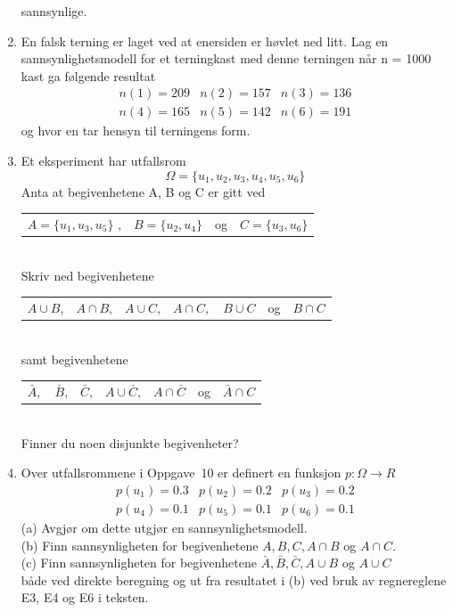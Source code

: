 \begin{enumerate}
     sannsynlige.
\item  En falsk terning er laget ved at enersiden er høvlet ned
     litt. Lag en sannsynlighetsmodell for et terningkast med
     denne terningen når n = 1000 kast ga følgende resultat
    \begin{eqnarray*}
        n(1)=209 & n(2)=157 & n(3)=136 \\
        n(4)=165 & n(5)=142 & n(6)=191 
    \end{eqnarray*}
     og hvor en tar hensyn til terningens form.
\item  Et eksperiment har utfallsrom
      \[ \Omega =\{u_1, u_2, u_3, u_4, u_5, u_6\} \]
     Anta at begivenhetene A, B og C er gitt ved \\[1mm]
    \begin{tabular}{cccc}
        $A=\{u_1, u_3, u_5\}$ ,& $B=\{u_2, u_4\}$ &og& $C=\{u_3, u_6\}$
    \end{tabular}\\[1mm]
     Skriv ned begivenhetene\\[1mm]
    \begin{tabular}{ccccccc}
      $A\cup B$,& $A\cap B$,& $A\cup C$,& $A\cap C,$&$B\cup C$&og&$B\cap C$
    \end{tabular} \\[1mm]
     samt begivenhetene\\[1mm]
    \begin{tabular}{ccccccc}
     $\bar{A},$&$\bar{B}$,&$\bar{C}$,&$A\cup \bar{C}$,& 
                              $A \cap \bar{C}$&og&$\bar{A} \cap C$
    \end{tabular}\\[1mm]
     Finner du noen disjunkte begivenheter?
\item  Over utfallsrommene i Oppgave~10 er definert en funksjon
     $p:\Omega \rightarrow R$
     \begin{eqnarray*}
     p(u_1)=0.3 & p(u_2)=0.2 & p(u_3)=0.2 \\
     p(u_4)=0.1 & p(u_5)=0.1 & p(u_6)=0.1
     \end{eqnarray*}
     (a)  Avgjør om dette utgjør en sannsynlighetsmodell. \\[1mm]
     (b)  Finn sannsynligheten for begivenhetene $A, B, C, A \cap
          B$ og $A \cap C$.\\[1mm]
     (c)  Finn sannsynligheten for begivenhetene $\bar{A},\bar{B},\bar{C},
                 A \cup B$ og $A \cup C$ \\[1mm]
         både ved direkte beregning og ut fra  
        resultatet i (b) ved bruk av regnereglene E3, E4 og E6 i teksten.

\end{enumerate}
